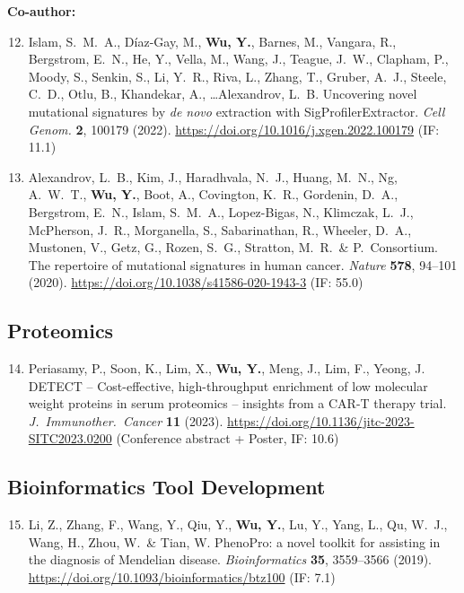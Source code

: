 \documentclass[11pt,a4paper]{article}
\begin{document}
\textbf{Co-author:}
\begin{enumerate}\setcounter{enumi}{11}
\item Islam, S.\ M.\ A., Díaz-Gay, M., \textbf{Wu, Y.}, Barnes, M., Vangara, R., Bergstrom, E.\ N., He, Y., Vella, M., Wang, J., Teague, J.\ W., Clapham, P., Moody, S., Senkin, S., Li, Y.\ R., Riva, L., Zhang, T., Gruber, A.\ J., Steele, C.\ D., Otlu, B., Khandekar, A., \ldots Alexandrov, L.\ B. Uncovering novel mutational signatures by \textit{de novo} extraction with SigProfilerExtractor. \textit{Cell Genom.} \textbf{2}, 100179 (2022). \url{https://doi.org/10.1016/j.xgen.2022.100179} (IF: 11.1)
\item Alexandrov, L.\ B., Kim, J., Haradhvala, N.\ J., Huang, M.\ N., Ng, A.\ W.\ T., \textbf{Wu, Y.}, Boot, A., Covington, K.\ R., Gordenin, D.\ A., Bergstrom, E.\ N., Islam, S.\ M.\ A., Lopez-Bigas, N., Klimczak, L.\ J., McPherson, J.\ R., Morganella, S., Sabarinathan, R., Wheeler, D.\ A., Mustonen, V., Getz, G., Rozen, S.\ G., Stratton, M.\ R.\ \& P.\ Consortium. The repertoire of mutational signatures in human cancer. \textit{Nature} \textbf{578}, 94--101 (2020). \url{https://doi.org/10.1038/s41586-020-1943-3} (IF: 55.0)
\end{enumerate}

\subsection*{Proteomics}

\begin{enumerate}\setcounter{enumi}{13}
\item Periasamy, P., Soon, K., Lim, X., \textbf{Wu, Y.}, Meng, J., Lim, F., Yeong, J. DETECT -- Cost-effective, high-throughput enrichment of low molecular weight proteins in serum proteomics -- insights from a CAR-T therapy trial. \textit{J.\ Immunother.\ Cancer} \textbf{11} (2023). \url{https://doi.org/10.1136/jitc-2023-SITC2023.0200} (Conference abstract + Poster, IF: 10.6)
\end{enumerate}

\subsection*{Bioinformatics Tool Development}

\begin{enumerate}\setcounter{enumi}{14}
\item Li, Z., Zhang, F., Wang, Y., Qiu, Y., \textbf{Wu, Y.}, Lu, Y., Yang, L., Qu, W.\ J., Wang, H., Zhou, W.\ \& Tian, W. PhenoPro: a novel toolkit for assisting in the diagnosis of Mendelian disease. \textit{Bioinformatics} \textbf{35}, 3559--3566 (2019). \url{https://doi.org/10.1093/bioinformatics/btz100} (IF: 7.1)
\end{enumerate}
\end{document}
